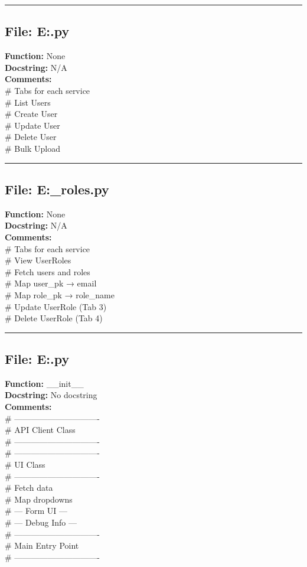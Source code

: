{\hrule

\subsection*{File: E:\project\capstone\frontend\admin\user.py}
\textbf{Function:} None\\
\textbf{Docstring:} N/A\\
\textbf{Comments:}\\
# Tabs for each service\\
# List Users\\
# Create User\\
# Update User\\
# Delete User\\
# Bulk Upload\\

\hrule

\subsection*{File: E:\project\capstone\frontend\admin\user_roles.py}
\textbf{Function:} None\\
\textbf{Docstring:} N/A\\
\textbf{Comments:}\\
# Tabs for each service\\
# View UserRoles\\
# Fetch users and roles\\
# Map user\_pk → email\\
# Map role\_pk → role\_name\\
# Update UserRole (Tab 3)\\
# Delete UserRole (Tab 4)\\

\hrule

\subsection*{File: E:\project\capstone\frontend\faculty\assignment.py}
\textbf{Function:} __init__\\
\textbf{Docstring:} No docstring\\
\textbf{Comments:}\\
# -------------------------------\\
# API Client Class\\
# -------------------------------\\
# -------------------------------\\
# UI Class\\
# -------------------------------\\
# Fetch data\\
# Map dropdowns\\
# --- Form UI ---\\
# --- Debug Info ---\\
# -------------------------------\\
# Main Entry Point\\
# -------------------------------\\

}
